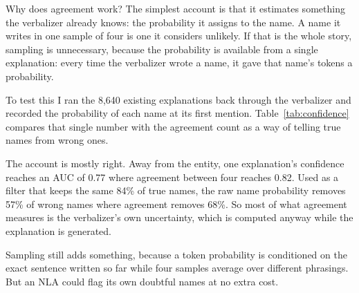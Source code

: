 Why does agreement work? The simplest account is that it estimates something the verbalizer already knows:
the probability it assigns to the name. A name it writes in one sample of four is one it considers unlikely.
If that is the whole story, sampling is unnecessary, because the probability is available from a single
explanation: every time the verbalizer wrote a name, it gave that name's tokens a probability.

To test this I ran the 8{,}640 existing explanations back through the verbalizer and recorded the probability
of each name at its first mention. Table~\ref{tab:confidence} compares that single number with the agreement
count as a way of telling true names from wrong ones.

\begin{table}[t]
\centering
\small

\caption[One explanation's own confidence against agreement between four]{One explanation's own
confidence against agreement between four (AUC, 95\% intervals; natural text). Each unit is one name in one
explanation. The name-probability column compares only names with the same number of tokens, because true
names are shorter than wrong ones and a raw product of token probabilities would separate them for that
reason alone; scored that way, random numbers give 0.50.}
\label{tab:confidence}
\end{table}

The account is mostly right. Away from the entity, one explanation's confidence reaches an AUC of 0.77 where
agreement between four reaches 0.82. Used as a filter that keeps the same 84\% of true names, the raw name
probability removes 57\% of wrong names where agreement removes 68\%. So most of what agreement measures is the verbalizer's
own uncertainty, which is computed anyway while the explanation is generated.

Sampling still adds something, because a token probability is conditioned on the exact sentence written so
far while four samples average over different phrasings. But an NLA could flag its own doubtful names at no
extra cost.
